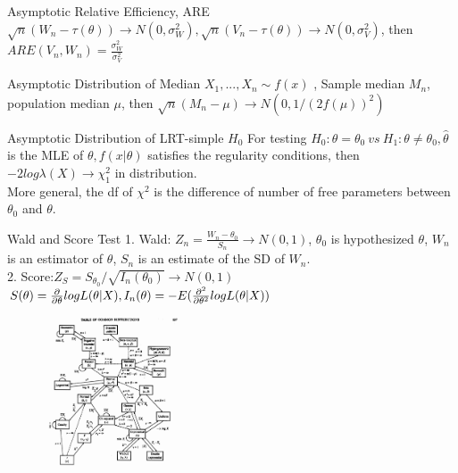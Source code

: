 \documentclass{article}
\begin{document}
\begin{multicols*}{3}
\begin{thmbox}{Asymptotic Relative Efficiency, ARE}
$\sqrt{n}(W_n - \tau(\theta)) \to N(0,\sigma_W^2), \sqrt{n}(V_n - \tau(\theta)) \to N(0,\sigma_V^2)$, then $ARE(V_n, W_n) = \frac{\sigma^2_W}{\sigma^2_V}$
\end{thmbox}

\begin{thmbox}{Asymptotic Distribution of Median}
$X_1,...,X_n \sim f(x)$ , Sample median $M_n$, population median $\mu$, then $\sqrt{n}(M_n - \mu) \to N(0, 1/(2f(\mu))^2)$
\end{thmbox}

\begin{thmbox}{Asymptotic Distribution of LRT-simple $H_0$}
    For testing $H_0 : \theta = \theta_0 \ vs \ H_1: \theta \ne \theta_0, \hat{\theta }$ is the MLE of $\theta, f(x\lvert \theta)$ satisfies the regularity conditions, then $-2log\lambda(X) \to \chi^2_1$ in distribution. \\
    More general, the df of $\chi^2$ is the difference of number of free parameters between $\theta_0$ and $\theta$.
\end{thmbox}

\begin{thmbox}{Wald and Score Test}
    1. Wald: $Z_n = \frac{W_n - \theta_0}{S_n} \to N(0, 1)$, $\theta_0$ is hypothesized $\theta$, $W_n$ is an estimator of $\theta$, $S_n$ is an estimate of the SD of $W_n$.\\ 
     2. Score:$Z_S = S_{\theta_0} / \sqrt{I_n(\theta_0)} \to N(0, 1)$ \\
        $S(\theta) = \frac{\partial}{\partial \theta}logL(\theta \lvert X), \\  I_n(\theta) = -E(\frac{\partial^2}{\partial \theta^2}log L(\theta \lvert X))$
\end{thmbox}

\begin{figure}[H] %
\centering 
\includegraphics[width=0.36\textwidth]{Dist_fig} 

\end{figure}

\end{multicols*}
\end{document}
